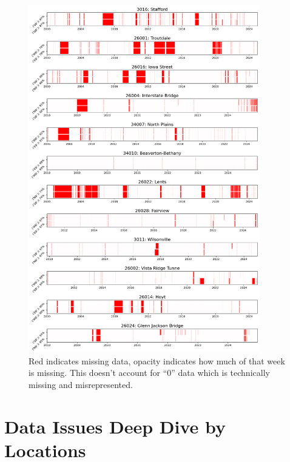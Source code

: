 \documentclass{article}
\begin{document}
\begin{figure}[H] 
    \centering
    \includegraphics[width=0.9\textwidth]{missing_data.png}
    \caption{Red indicates missing data, opacity indicates how much of that week is missing. This doesn't account for ``0'' data which is technically missing and misrepresented.}
    \label{fig:data_availability}
\end{figure}

\section{Data Issues Deep Dive by Locations} \label{app:data_issues}
\end{document}
